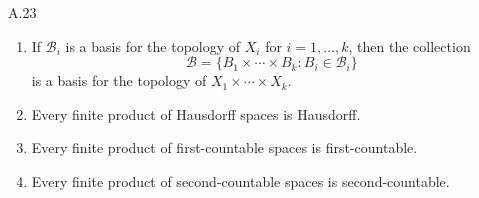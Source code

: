 \begin{exercise}{A.23}
\begin{enumerate}[itemsep=0pt,label={(\alph*)}]
        \item If \( \mathcal{B}_{i} \) is a basis for the topology of \( X_{i} \) for \( i = 1, \ldots, k \), then the collection
              \[
                  \mathcal{B} = \{B_{1} \times \cdots \times B_{k} : B_{i} \in \mathcal{B}_{i}\}
              \]
              is a basis for the topology of \( X_{1} \times \cdots \times X_{k} \).

        \item Every finite product of Hausdorff spaces is Hausdorff.

        \item Every finite product of first-countable spaces is first-countable.

        \item Every finite product of second-countable spaces is second-countable.
    \end{enumerate}
\end{exercise}

